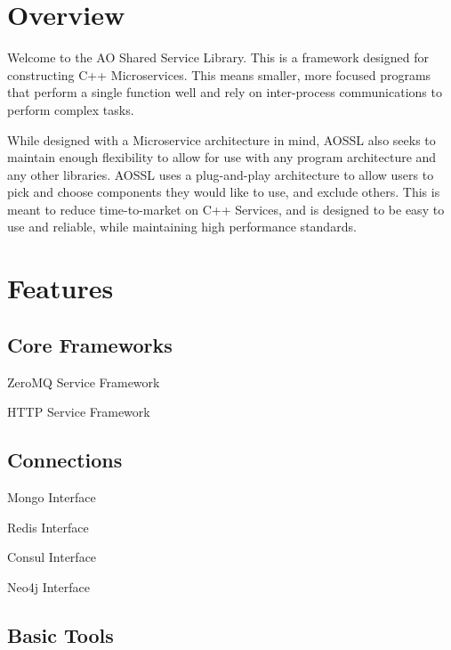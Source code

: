 \hypertarget{index_over}{}\section{Overview}\label{index_over}
Welcome to the AO Shared Service Library. This is a framework designed for constructing C++ Microservices. This means smaller, more focused programs that perform a single function well and rely on inter-\/process communications to perform complex tasks.

While designed with a Microservice architecture in mind, A\+O\+S\+SL also seeks to maintain enough flexibility to allow for use with any program architecture and any other libraries. A\+O\+S\+SL uses a plug-\/and-\/play architecture to allow users to pick and choose components they would like to use, and exclude others. This is meant to reduce time-\/to-\/market on C++ Services, and is designed to be easy to use and reliable, while maintaining high performance standards.\hypertarget{index_features}{}\section{Features}\label{index_features}
\hypertarget{index_core}{}\subsection{Core Frameworks}\label{index_core}

\begin{DoxyItemize}
\item Zero\+MQ Service Framework
\item H\+T\+TP Service Framework
\end{DoxyItemize}\hypertarget{index_conn}{}\subsection{Connections}\label{index_conn}

\begin{DoxyItemize}
\item Mongo Interface
\item Redis Interface
\item Consul Interface
\item Neo4j Interface
\end{DoxyItemize}\hypertarget{index_tools}{}\subsection{Basic Tools}\label{index_tools}


